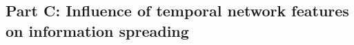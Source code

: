 \documentclass[letterpaper]{article}
\begin{document}
\subsection*{Part C: Influence of temporal network features on information spreading}
\label{sec:partC}
\todo{}
\end{document}
